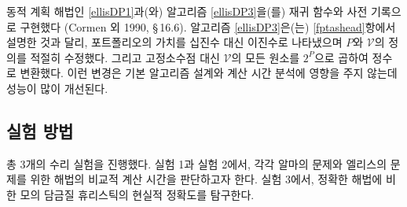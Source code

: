 \documentclass[11pt]{article} %
\newif\ifen
\theoremstyle{definition}
\theoremstyle{definition}
\begin{document}
\ifen
The dynamic programs, namely Algorithms \ref{ellisDP1} and \ref{ellisDP3}, were implemented using recursive functions and dictionary memoization, as described in Cormen et al. (1990, \S\,16.6). Our implementation of Algorithm \ref{ellisDP3} also differed from that described in Subsection \ref{fptashead} in that we represented portfolio valuations in \emph{binary} rather than decimal, with the definitions of $P$ and $\mathcal{V}$ modified accordingly, and instead of fixed-point numbers, we worked in integers by multiplying each element of $\mathcal{V}$ by $2^P$. These modifications yield a substantial performance improvement without changing the fundamental algorithm design or complexity analysis.
\else
동적 계획 해법인 \ref{ellisDP1}과(와) 알고리즘 \ref{ellisDP3}을(를) 재귀 함수와 사전 기록으로 구현했다 (Cormen 외 1990, \S\,16.6). 알고리즘 \ref{ellisDP3}은(는) \ref{fptashead}항에서 설명한 것과 달리, 포트폴리오의 가치를 십진수 대신 이진수로 나타냈으며 $P$와  $\mathcal{V}$의 정의를 적절히 수정했다. 그리고 고정소수점 대신 $\mathcal{V}$의 모든 원소를 $2^P$으로 곱하여 정수로 변환했다. 이런 변경은 기본 알고리즘 설계와 계산 시간 분석에 영향을 주지 않는데 성능이 많이 개선된다.
\fi


\ifen \subsection{Experimental procedure} \else \subsection{실험 방법}\fi
\ifen
We conducted three numerical experiments. Experiments 1 and 2 evaluate the computation times of our algorithms for Alma's problem and Ellis's problem, respectively. Experiment 3 investigates the empirical accuracy of the simulated-annealing heuristic as compared to an exact algorithm. 
\else
총 3개의 수리 실험을 진행했다. 실험 1과 실험 2에서, 각각 알마의 문제와 엘리스의 문제를 위한 해법의 비교적 계산 시간을 판단하고자 한다. 실험 3에서, 정확한 해법에 비한 모의 담금질 휴리스틱의 현실적 정확도를 탐구한다.
\fi
\end{document}
